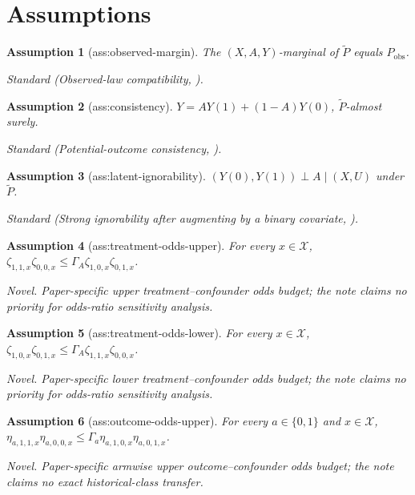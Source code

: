 \documentclass{article}
\newtheorem{assumption}{Assumption}
\begin{document}
\section{Assumptions}

\begin{assumption}[ass:observed-margin]\label{ass:observed-margin}
The \((X,A,Y)\)-marginal of \(\widetilde P\) equals \(P_{\mathrm{obs}}\).
\par\smallskip\noindent\emph{Standard} (Observed-law compatibility, \cite{RosenbaumRubin1983Sensitivity}).
\end{assumption}

\begin{assumption}[ass:consistency]\label{ass:consistency}
\(Y=AY(1)+(1-A)Y(0)\), \(\widetilde P\)-almost surely.
\par\smallskip\noindent\emph{Standard} (Potential-outcome consistency, \cite{RosenbaumRubin1983Sensitivity}).
\end{assumption}

\begin{assumption}[ass:latent-ignorability]\label{ass:latent-ignorability}
\((Y(0),Y(1))\perp A\mid(X,U)\) under \(\widetilde P\).
\par\smallskip\noindent\emph{Standard} (Strong ignorability after augmenting by a binary covariate, \cite{RosenbaumRubin1983Sensitivity}).
\end{assumption}

\begin{assumption}[ass:treatment-odds-upper]\label{ass:treatment-odds-upper}
For every \(x\in\mathcal X\), \(\zeta_{1,1,x}\zeta_{0,0,x}\leq\Gamma_A\zeta_{1,0,x}\zeta_{0,1,x}\).
\par\smallskip\noindent\emph{Novel.} Paper-specific upper treatment--confounder odds budget; the note claims no priority for odds-ratio sensitivity analysis.
\end{assumption}

\begin{assumption}[ass:treatment-odds-lower]\label{ass:treatment-odds-lower}
For every \(x\in\mathcal X\), \(\zeta_{1,0,x}\zeta_{0,1,x}\leq\Gamma_A\zeta_{1,1,x}\zeta_{0,0,x}\).
\par\smallskip\noindent\emph{Novel.} Paper-specific lower treatment--confounder odds budget; the note claims no priority for odds-ratio sensitivity analysis.
\end{assumption}

\begin{assumption}[ass:outcome-odds-upper]\label{ass:outcome-odds-upper}
For every \(a\in\{0,1\}\) and \(x\in\mathcal X\), \(\eta_{a,1,1,x}\eta_{a,0,0,x}\leq\Gamma_a\eta_{a,1,0,x}\eta_{a,0,1,x}\).
\par\smallskip\noindent\emph{Novel.} Paper-specific armwise upper outcome--confounder odds budget; the note claims no exact historical-class transfer.
\end{assumption}
\end{document}
